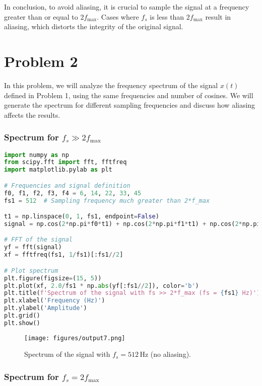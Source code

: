 \documentclass[10pt]{article}
\theoremstyle{definition}
\theoremstyle{remark}
\theoremstyle{definition}
\numberwithin{equation}{prob}
\begin{document}
In conclusion, to avoid aliasing, it is crucial to sample the signal at a frequency greater than or equal to \( 2f_{\text{max}} \). Cases where \( f_s \) is less than \( 2f_{\text{max}} \) result in aliasing, which distorts the integrity of the original signal.

\section{Problem 2}

In this problem, we will analyze the frequency spectrum of the signal \( x(t) \) defined in Problem 1, using the same frequencies and number of cosines. We will generate the spectrum for different sampling frequencies and discuss how aliasing affects the results.

\subsubsection{Spectrum for \( f_s \gg 2f_{\text{max}} \)}

\begin{lstlisting}[language=Python]
import numpy as np
from scipy.fft import fft, fftfreq
import matplotlib.pylab as plt

# Frequencies and signal definition
f0, f1, f2, f3, f4 = 6, 14, 22, 33, 45
fs1 = 512  # Sampling frequency much greater than 2*f_max

t1 = np.linspace(0, 1, fs1, endpoint=False)
signal = np.cos(2*np.pi*f0*t1) + np.cos(2*np.pi*f1*t1) + np.cos(2*np.pi*f2*t1) + np.cos(2*np.pi*f3*t1) + np.cos(2*np.pi*f4*t1)

# FFT of the signal
yf = fft(signal)
xf = fftfreq(fs1, 1/fs1)[:fs1//2]

# Plot spectrum
plt.figure(figsize=(15, 5))
plt.plot(xf, 2.0/fs1 * np.abs(yf[:fs1//2]), color='b')
plt.title(f'Spectrum of the signal with fs >> 2*f_max (fs = {fs1} Hz)')
plt.xlabel('Frequency (Hz)')
plt.ylabel('Amplitude')
plt.grid()
plt.show()
\end{lstlisting}

\begin{figure}[H]
    \centering
    \texttt{[image: figures/output7.png]}  
    \caption{Spectrum of the signal with \( f_s = 512 \, \text{Hz} \) (no aliasing).}
\end{figure}

\subsubsection{Spectrum for \( f_s = 2f_{\text{max}} \)}
\end{document}
